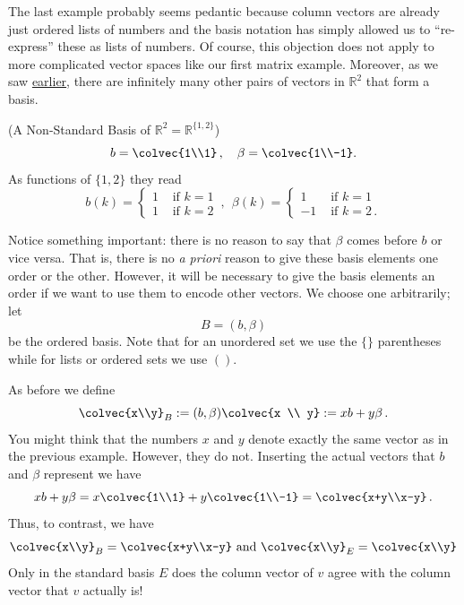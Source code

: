 The last example probably seems pedantic because column vectors are already just ordered lists of numbers and the basis notation 
has simply allowed us to ``re-express'' these as lists of numbers. Of course, this objection does not apply to more complicated vector spaces like our first matrix example. Moreover, as we saw \hyperlink{nonstandard r2 basis}{earlier}, there are infinitely many other pairs of vectors in $\mathbb{R}^2$ that form a basis.

\begin{example}(A Non-Standard Basis of $\mathbb{R}^2=\mathbb{R}^{\{1,2\}}$)\\
\[
b=\colvec{1\\1}\, ,\quad \beta=\colvec{1\\-1}.
\]
As functions of $\{1,2\}$ they read
\begin{displaymath}
   b (k)= \left\{
     \begin{array}{lr}
       1 & \text{~if~} k=1\\
       1 & \text{~if~} k=2
     \end{array}
   \right. \, ,~~
   \beta (k)= \left\{
     \begin{array}{rl}
       1 & \text{~if~} k=1\\
       -1 & \text{~if~} k=2\, .
     \end{array}
   \right.
\end{displaymath} 

Notice something important: there is no reason to say that $\beta$ comes before $b$ or vice versa. That is, there is no {\itshape a priori} reason to give these basis elements one order or the other. 
However, it will be necessary to give the basis elements an order if we want to use them to encode other vectors.  We choose one arbitrarily; let \[B=(b,\beta)\] be the ordered basis. Note that for an unordered set we use the $\{\}$ parentheses while for lists or ordered sets we use $()$. 

As before we define 
\[
\colvec{x\\y}_B :=(b,\beta)\colvec{x \\ y}:= xb+ y \beta\, . 
\]
You might think that the numbers $x$ and $y$ denote exactly the same vector as in the previous example. However, they do not. Inserting
the actual vectors that $b$ and $\beta$ represent we have
\[
xb+ y \beta=x\colvec{1\\1}+y\colvec{1\\-1}=\colvec{x+y\\x-y}\, .
\]
Thus, to contrast, we have
\[
\colvec{x\\y}_B=\colvec{x+y\\x-y} \mbox{ and } \colvec{x\\y}_E=\colvec{x\\y}
\]
Only in the standard basis $E$ does the column vector of $v$ agree with the column vector that $v$ actually is!


\end{example}
